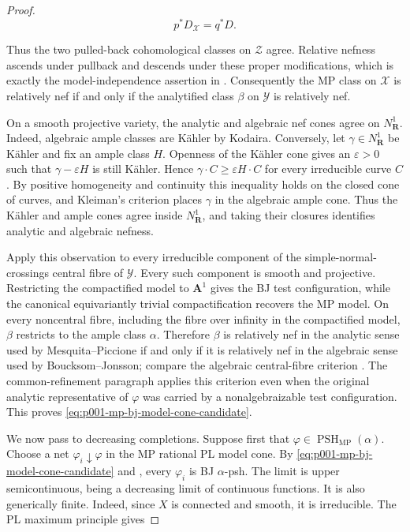 \begin{proof}
\[
                  p^*D_{\mathcal X}=q^*D.
\]

Thus the two pulled-back cohomological classes on \(\mathcal Z\) agree.
Relative nefness ascends under pullback and descends under these proper
modifications, which is exactly the model-independence assertion in
\cite[Definition~4.1.2 and the proof of Theorem~4.1.5]{MP24}.
Consequently the MP class on \(\mathcal X\) is relatively nef if and only
if the analytified class \(\beta\) on \(\mathcal Y\) is relatively nef.

On a smooth projective variety, the analytic and algebraic nef cones agree
on \(N^1_{\mathbf R}\).  Indeed, algebraic ample classes are Kähler by
Kodaira.  Conversely, let \(\gamma\in N^1_{\mathbf R}\) be Kähler and fix
an ample class \(H\).  Openness of the Kähler cone gives an
\(\varepsilon>0\) such that
\(\gamma-\varepsilon H\) is still Kähler.  Hence
\(\gamma\cdot C\geq\varepsilon H\cdot C\) for every irreducible curve
\(C\).  By positive homogeneity and continuity this inequality holds on
the closed cone of curves, and Kleiman's criterion places \(\gamma\) in
the algebraic ample cone.  Thus the Kähler and ample cones agree inside
\(N^1_{\mathbf R}\), and taking their closures identifies analytic and
algebraic nefness.

Apply this observation to every irreducible component of the
simple-normal-crossings central fibre of \(\mathcal Y\).  Every such
component is smooth and projective.  Restricting the compactified model
to \(\mathbf A^1\) gives the BJ test configuration, while the canonical
equivariantly trivial compactification recovers the MP model.  On every
noncentral fibre, including the fibre over infinity in the compactified
model, \(\beta\) restricts to the ample class \(\alpha\).  Therefore
\(\beta\)
is relatively nef in the analytic sense used by Mesquita--Piccione if and
only if it is relatively nef in the algebraic sense used by
Boucksom--Jonsson; compare the algebraic central-fibre criterion
\cite[Lemma~3.1]{BJ22}.  The common-refinement paragraph applies this
criterion even when the original analytic representative of \(\varphi\)
was carried by a nonalgebraizable test configuration.  This proves
\eqref{eq:p001-mp-bj-model-cone-candidate}.

We now pass to decreasing completions.  Suppose first that
\(\varphi\in\operatorname{PSH}_{\mathrm{MP}}(\alpha)\).  Choose a net
\(\varphi_i\downarrow\varphi\) in the MP rational PL model cone.  By
\eqref{eq:p001-mp-bj-model-cone-candidate} and
\cite[Lemma~4.3]{BJ22}, every \(\varphi_i\) is BJ
\(\alpha\)-psh.  The limit is upper semicontinuous, being a decreasing
limit of continuous functions.  It is also generically finite.  Indeed,
since \(X\) is connected and smooth, it is irreducible.  The PL maximum
principle \cite[Proposition~3.6(iv)]{BJ22} gives


\end{proof}
